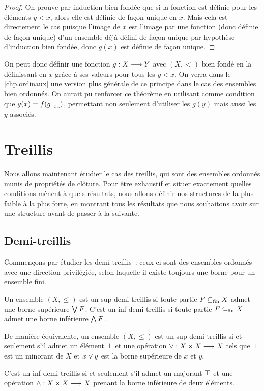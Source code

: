 \begin{proof}
  On prouve par induction bien fondée que si la fonction est définie pour les
  éléments $y < x$, alors elle est définie de façon unique en $x$. Mais cela
  est directement le cas puisque l'image de $x$ est l'image par une fonction
  (donc définie de façon unique) d'un ensemble déjà défini de façon unique par
  hypothèse d'induction bien fondée, donc $g(x)$ est définie de façon unique.
\end{proof}

On peut donc définir une fonction $g : \displaystyle X \longrightarrow Y$ avec $(X,<)$ bien
fondé en la définissant en $x$ grâce à ses valeurs pour tous les $y < x$. On
verra dans le \cref{chp.ordinaux} une version plus générale de ce principe dans
le cas des ensembles bien ordonnés.
On aurait pu renforcer ce théorème en utilisant comme
condition que $g(x) = f(g\mathbin{\upharpoonright}_{x\mathbin{\downarrow}})$, permettant non seulement
d'utiliser les $g(y)$ mais aussi les $y$ associés.

\section{Treillis}

Nous allons maintenant étudier le cas des treillis, qui sont des ensembles
ordonnés munis de propriétés de clôture. Pour être exhaustif et situer
exactement quelles conditions mènent à quels résultats, nous allons définir nos
structures de la plus faible à la plus forte, en montrant tous les résultats que
nous souhaitons avoir sur une structure avant de passer à la suivante.

\subsection{Demi-treillis}

Commençons par étudier les demi-treillis~: ceux-ci sont des ensembles ordonnés
avec une direction privilégiée, selon laquelle il existe toujours une borne
pour un ensemble fini.

\begin{definition}
  Un ensemble $(X,\leq)$ est un sup demi-treillis si toute partie $F\subseteq_{\mathrm{fin}} X$
  admet une borne supérieure $\bigvee F$. C'est un inf demi-treillis si toute
  partie $F\subseteq_{\mathrm{fin}} X$ admet une borne inférieure $\bigwedge F$.
\end{definition}

\begin{property}
  De manière équivalente, un ensemble $(X,\leq)$ est un sup demi-treillis si et
  seulement s'il admet un élément $\bot$ et une opération
  $\vee : \displaystyle X \times X \longrightarrow X$ tels que $\bot$ est un minorant de $X$ et
  $x\vee y$ est la borne supérieure de $x$ et $y$.

  C'est un inf demi-treillis si et seulement s'il admet un majorant $\top$ et
  une opération $\wedge : \displaystyle X \times X \longrightarrow X$ prenant la borne inférieure
  de deux éléments.
\end{property}

